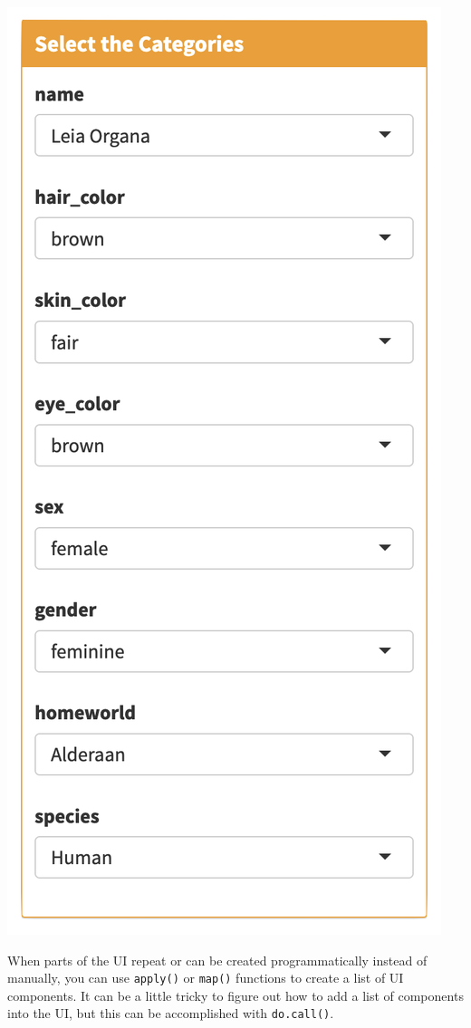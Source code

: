\documentclass[
  oneside]{book}
\begin{document}
\includegraphics{images/structure_ui.png}

When parts of the UI repeat or can be created programmatically instead of manually, you can use \texttt{apply}\texttt{()} or \texttt{map}\texttt{()} functions to create a list of UI components. It can be a little tricky to figure out how to add a list of components into the UI, but this can be accomplished with \texttt{do.call}\texttt{()}.
\end{document}
